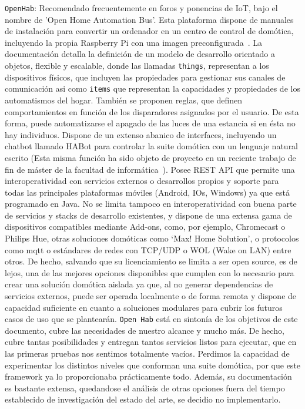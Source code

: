 \verb|OpenHab|: Recomendado frecuentemente en foros y ponencias de IoT, bajo el nombre de 'Open Home Automation Bus'. Esta plataforma dispone de manuales de instalación para convertir un ordenador en un centro de control de domótica, incluyendo la propia Raspberry Pi con una imagen preconfigurada~\cite{openHabRaspberryPi}. La documentación detalla la definición de un modelo de desarrollo orientado a objetos, flexible y escalable, donde las llamadas \verb|things|, representan a los dispositivos físicos, que incluyen las propiedades para gestionar sus canales de comunicación asi como \verb|items| que representan la capacidades y propiedades de los automatismos del hogar. También se proponen reglas, que definen comportamientos en función de los disparadores asignados por el usuario. De esta forma, puede automatizarse el apagado de las luces de una estancia si en ésta no hay individuos. Dispone de un extenso abanico de interfaces, incluyendo un chatbot llamado HABot para controlar la suite domótica con un lenguaje natural escrito (Esta misma función ha sido objeto de proyecto en un reciente trabajo de fin de máster de la facultad de informática~\cite{eprint49443}). Posee REST API que permite una interoperatividad con servicios externos o desarrollos propios y soporte para todas las principales plataformas móviles (Android, IOs, Windows) ya que está programado en Java. No se limita tampoco en interoperatividad con buena parte de servicios y stacks de desarrollo existentes, y dispone de una extensa gama de dispositivos compatibles mediante Add-ons, como, por ejemplo, Chromecast o Philips Hue, otras soluciones domóticas como ‘Max! Home Solution’, o protocolos como \gls{mqtt} o estándares de redes con TCP/UDP o WOL (Wake on LAN) entre otros. De hecho, salvando que su licenciamiento se limita a ser open source, es de lejos, una de las mejores opciones disponibles que cumplen con lo necesario para crear una solución domótica aislada ya que, al no generar dependencias de servicios externos, puede ser operada localmente o de forma remota y dispone de capacidad suficiente en cuanto a soluciones modulares para cubrir los futuros casos de uso que se plantearán. \verb|Open Hab| está en sintonía de los objetivos de este documento, cubre las necesidades de nuestro alcance y mucho más. De hecho, cubre tantas posibilidades y entregan tantos servicios listos para ejecutar, que en las primeras pruebas nos sentimos totalmente vacíos. Perdimos la capacidad de experimentar los distintos niveles que conforman una suite domótica, por que este \gls{framework} ya lo proporcionaba prácticamente todo. Además, su documentación es bastante extensa, quedandose el análisis de otras opciones fuera del tiempo establecido de investigación del estado del arte, se decidio no implementarlo.

